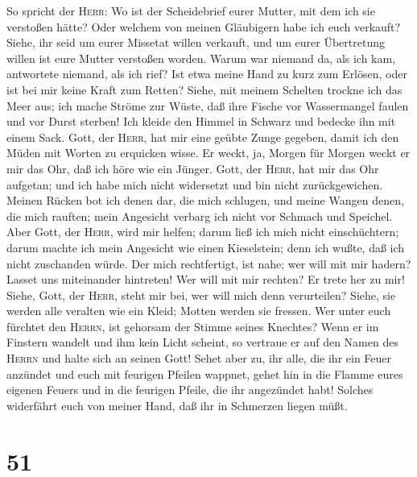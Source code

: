 So spricht der \textsc{Herr}: Wo ist der Scheidebrief
eurer Mutter, mit dem ich sie verstoßen hätte? Oder welchem von meinen
Gläubigern habe ich euch verkauft? Siehe, ihr seid um eurer Missetat
willen verkauft, und um eurer Übertretung willen ist eure Mutter
verstoßen worden.  Warum war niemand da, als ich kam,
antwortete niemand, als ich rief? Ist etwa meine Hand zu kurz zum
Erlösen, oder ist bei mir keine Kraft zum Retten? Siehe, mit meinem
Schelten trockne ich das Meer aus; ich mache Ströme zur Wüste, daß ihre
Fische vor Wassermangel faulen und vor Durst sterben!  Ich
kleide den Himmel in Schwarz und bedecke ihn mit einem Sack.
 Gott, der \textsc{Herr}, hat mir eine geübte Zunge
gegeben, damit ich den Müden mit Worten zu erquicken wisse. Er weckt,
ja, Morgen für Morgen weckt er mir das Ohr, daß ich höre wie ein Jünger.
 Gott, der \textsc{Herr}, hat mir das Ohr aufgetan; und
ich habe mich nicht widersetzt und bin nicht zurückgewichen.
 Meinen Rücken bot ich denen dar, die mich schlugen, und
meine Wangen denen, die mich rauften; mein Angesicht verbarg ich nicht
vor Schmach und Speichel.  Aber Gott, der \textsc{Herr},
wird mir helfen; darum ließ ich mich nicht einschüchtern; darum machte
ich mein Angesicht wie einen Kieselstein; denn ich wußte, daß ich nicht
zuschanden würde.  Der mich rechtfertigt, ist nahe; wer
will mit mir hadern? Lasset uns miteinander hintreten! Wer will mit mir
rechten? Er trete her zu mir!  Siehe, Gott, der
\textsc{Herr}, steht mir bei, wer will mich denn verurteilen? Siehe, sie
werden alle veralten wie ein Kleid; Motten werden sie fressen.
 Wer unter euch fürchtet den \textsc{Herrn}, ist gehorsam
der Stimme seines Knechtes? Wenn er im Finstern wandelt und ihm kein
Licht scheint, so vertraue er auf den Namen des \textsc{Herrn} und halte
sich an seinen Gott!  Sehet aber zu, ihr alle, die ihr
ein Feuer anzündet und euch mit feurigen Pfeilen wappnet, gehet hin in
die Flamme eures eigenen Feuers und in die feurigen Pfeile, die ihr
angezündet habt! Solches widerfährt euch von meiner Hand, daß ihr in
Schmerzen liegen müßt.

\hypertarget{section-50}{%
\section{51}\label{section-50}}


